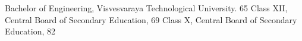 %
%
%



\begin{scholarship}
					{ Bachelor of Engineering, Visvesvaraya Technological University. 65\text{\%}}
					{Class XII, Central Board of Secondary Education,   69\text{\%}}
					{Class X, Central Board of Secondary Education,   82\text{\%}}

\end{scholarship}\\
